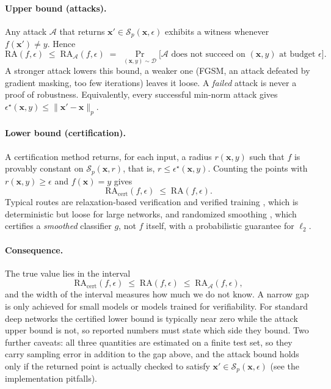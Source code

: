 \documentclass[10pt,a4paper]{extarticle}
\theoremstyle{definition}
\newcommand{\D}{\mathcal{D}}
\newcommand{\x}{\mathbf{x}}
\newcommand{\xadv}{\mathbf{x}'}
\begin{document}
\paragraph{Upper bound (attacks).} Any attack \(\mathcal{A}\) that returns \(\xadv\in\mathcal{S}_p(\x,\epsilon)\) exhibits a witness whenever \(f(\xadv)\neq y\). Hence
\[
\mathrm{RA}(f,\epsilon)\;\le\;\mathrm{RA}_{\mathcal{A}}(f,\epsilon)\;=\;\Pr_{(\x,y)\sim\D}\big[\text{\(\mathcal{A}\) does not succeed on }(\x,y)\text{ at budget }\epsilon\big].
\]
A stronger attack lowers this bound, a weaker one (FGSM, an attack defeated by gradient masking, too few iterations) leaves it loose. A \emph{failed} attack is never a proof of robustness. Equivalently, every successful min-norm attack gives \(\epsilon^\star(\x,y)\le\|\xadv-\x\|_p\).

\paragraph{Lower bound (certification).} A certification method returns, for each input, a radius \(r(\x,y)\) such that \(f\) is provably constant on \(\mathcal{S}_p(\x,r)\), that is, \(r\le\epsilon^\star(\x,y)\). Counting the points with \(r(\x,y)\ge\epsilon\) and \(f(\x)=y\) gives
\[
\mathrm{RA}_{\mathrm{cert}}(f,\epsilon)\;\le\;\mathrm{RA}(f,\epsilon).
\]
Typical routes are relaxation-based verification and verified training \citep{wong2018provable,gowal2019scalable}, which is deterministic but loose for large networks, and randomized smoothing \citep{cohen2019certified}, which certifies a \emph{smoothed} classifier \(g\), not \(f\) itself, with a probabilistic guarantee for \(\ell_2\).

\paragraph{Consequence.} The true value lies in the interval
\[
\mathrm{RA}_{\mathrm{cert}}(f,\epsilon)\;\le\;\mathrm{RA}(f,\epsilon)\;\le\;\mathrm{RA}_{\mathcal{A}}(f,\epsilon),
\]
and the width of the interval measures how much we do not know. A narrow gap is only achieved for small models or models trained for verifiability. For standard deep networks the certified lower bound is typically near zero while the attack upper bound is not, so reported numbers must state which side they bound. Two further caveats: all three quantities are estimated on a finite test set, so they carry sampling error in addition to the gap above, and the attack bound holds only if the returned point is actually checked to satisfy \(\xadv\in\mathcal{S}_p(\x,\epsilon)\) (see the implementation pitfalls).
\end{document}

